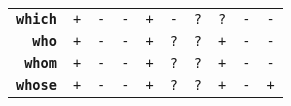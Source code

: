 \documentclass{article}
\begin{document}
\begin{minipage}{\textwidth}
{\begin{tabular}{|r|c|c|c|c|c|c|c|c|c|}
    \textbf{\texttt{which}} & \texttt{+}
    & \texttt{-} & \texttt{-}
    & \texttt{+} & \texttt{-}
    & \texttt{?} & \texttt{?}
    & \texttt{-} & \texttt{-} \\
    \textbf{\texttt{who}} & \texttt{+}
    & \texttt{-} & \texttt{-}
    & \texttt{+} & \texttt{?}
    & \texttt{?} & \texttt{+}
    & \texttt{-} & \texttt{-} \\
    \textbf{\texttt{whom}} & \texttt{+}
    & \texttt{-} & \texttt{-}
    & \texttt{+} & \texttt{?}
    & \texttt{?} & \texttt{+}
    & \texttt{-} & \texttt{-} \\
    \textbf{\texttt{whose}} & \texttt{+}
    & \texttt{-} & \texttt{-}
    & \texttt{+} & \texttt{?}
    & \texttt{?} & \texttt{+}
    & \texttt{-} & \texttt{+} \\
    \hline
  \end{tabular}
  }
\end{minipage}
\bigbreak
\end{document}
